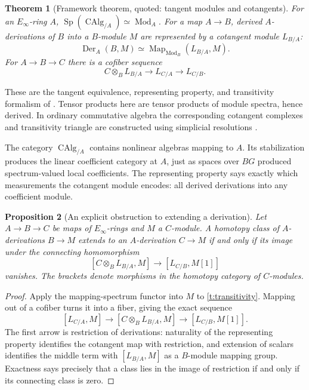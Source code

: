 \documentclass[11pt]{article}
\newtheorem{theorem}{Theorem}[section]
\newtheorem{proposition}[theorem]{Proposition}
\theoremstyle{definition}
\theoremstyle{remark}\newtheorem{remark}[theorem]{Remark}
\begin{document}
\begin{theorem}[Framework theorem, quoted: tangent modules and cotangents]
\label{t:cotangent-foundation}
For an $E_\infty$-ring $A$,
$\operatorname{Sp}(\operatorname{CAlg}_{/A})\simeq\operatorname{Mod}_A$.
For a map $A\to B$, derived $A$-derivations of $B$ into a $B$-module $M$
are represented by a cotangent module $L_{B/A}$:
\[
 \operatorname{Der}_A(B,M)
 \simeq\operatorname{Map}_{\operatorname{Mod}_B}(L_{B/A},M).
\]
For $A\to B\to C$ there is a cofiber sequence
\begin{equation}\label{t:transitivity}
 C\otimes_B L_{B/A}\longrightarrow L_{C/A}
 \longrightarrow L_{C/B}.
\end{equation}
\end{theorem}
These are the tangent equivalence, representing property, and transitivity
formalism of \cite[\S7.3; Corollaries 7.3.4.14 and 7.3.3.6]{HA}.
Tensor products here are tensor products of module spectra, hence derived.
In ordinary commutative algebra the corresponding cotangent complexes
and transitivity triangle are constructed using simplicial resolutions
\cite[Tag 08QX]{Stacks}.

The category $\operatorname{CAlg}_{/A}$ contains nonlinear algebras mapping
to $A$.  Its stabilization produces the linear coefficient category at
$A$, just as spaces over $BG$ produced spectrum-valued local coefficients.
The representing property says exactly which measurements the cotangent
module encodes: all derived derivations into any coefficient module.

\begin{proposition}[An explicit obstruction to extending a derivation]
\label{t:derivation-obstruction}
Let $A\to B\to C$ be maps of $E_\infty$-rings and $M$ a $C$-module.
A homotopy class of $A$-derivations $B\to M$ extends to an $A$-derivation
$C\to M$ if and only if its image under the connecting homomorphism
\[
 [C\otimes_B L_{B/A},M]
   \longrightarrow [L_{C/B},M[1]]
\]
vanishes.  The brackets denote morphisms in the homotopy category of
$C$-modules.
\end{proposition}
\begin{proof}
Apply the mapping-spectrum functor into $M$ to
\eqref{t:transitivity}.  Mapping out of a cofiber turns it into a fiber,
giving the exact sequence
\[
 [L_{C/A},M]\longrightarrow[C\otimes_B L_{B/A},M]
   \longrightarrow[L_{C/B},M[1]].
\]
The first arrow is restriction of derivations: naturality of the
representing property identifies the cotangent map with restriction,
and extension of scalars identifies the middle term with
$[L_{B/A},M]$ as a $B$-module mapping group.
Exactness says precisely that a class lies in the image of restriction
if and only if its connecting class is zero.
\end{proof}
\end{document}
